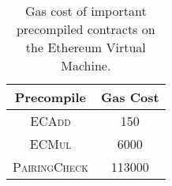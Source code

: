 \begin{table}
\centering
\begin{tabular}{|c|c|}
\hline
Precompile & Gas Cost \\
\hline
\hline
\textsc{ECAdd} & 150 \\
\textsc{ECMul} & 6000 \\
\textsc{PairingCheck} &  113000 \\
\hline
\end{tabular}
\caption[EVM Gas Cost]{Gas cost of important precompiled contracts on the
    Ethereum Virtual Machine.}
\label{tab:evm_gas_cost}
\end{table}

